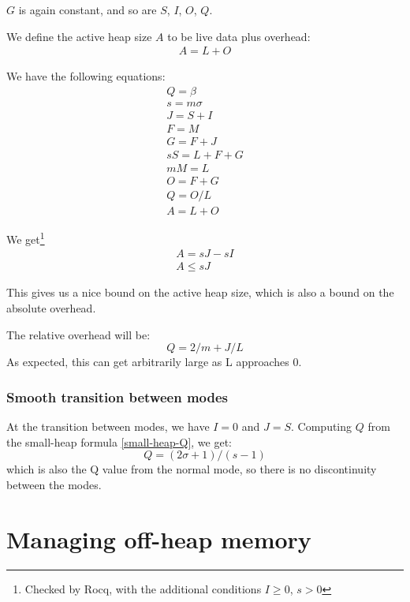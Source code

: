 \documentclass{article}
\begin{document}
$G$ is again constant, and so are $S$, $I$, $O$, $Q$.

We define the active heap size $A$ to be live data plus overhead:
\begin{gather*}
A = L + O
\end{gather*}

We have the following equations:
\begin{gather*}
Q = \beta      \\
s = m \sigma   \\
J = S + I      \\
F = M          \\
G = F + J      \\
sS = L + F + G \\
mM = L         \\
O = F + G      \\
Q = O/L        \\
A = L + O
\end{gather*}

We get\footnote{Checked by Rocq, with the additional conditions
$I \ge 0$,
$s > 0$
}
\begin{gather*}
A = sJ - sI \\
A \leq sJ
\end{gather*}


This gives us a nice bound on the active heap size, which is also a
bound on the absolute overhead.

The relative overhead will be:
\begin{equation}\label{small-heap-Q}
  Q = 2/m + J/L
\end{equation}
As expected, this can get arbitrarily large as L approaches 0.

\subsubsection{Smooth transition between modes}

At the transition between modes, we have $I = 0$ and $J =
S$. Computing $Q$ from the small-heap formula \eqref{small-heap-Q}, we
get:
\begin{equation}
  Q = (2\sigma+1)/(s-1)
\end{equation}
which is also the Q value from the normal mode, so there is no
discontinuity between the modes.


\section{Managing off-heap memory}
\end{document}
